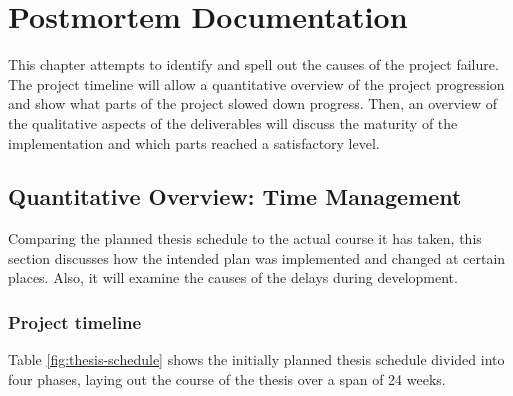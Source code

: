 \chapter{Postmortem Documentation}
\label{chap:postmortem}
This chapter attempts to identify and spell out the causes of the project failure. The project timeline will allow a quantitative overview of the project progression and show what parts of the project slowed down progress. Then, an overview of the qualitative aspects of the deliverables will discuss the maturity of the implementation and which parts reached a satisfactory level.

\section{Quantitative Overview: Time Management}
Comparing the planned thesis schedule to the actual course it has taken, this section discusses how the intended plan was implemented and changed at certain places. Also, it will examine the causes of the delays during development.
\label{sec:project-timeline}
\subsection{Project timeline}
Table \ref{fig:thesis-schedule} shows the initially planned thesis schedule divided into four phases, laying out the course of the thesis over a span of 24 weeks.

